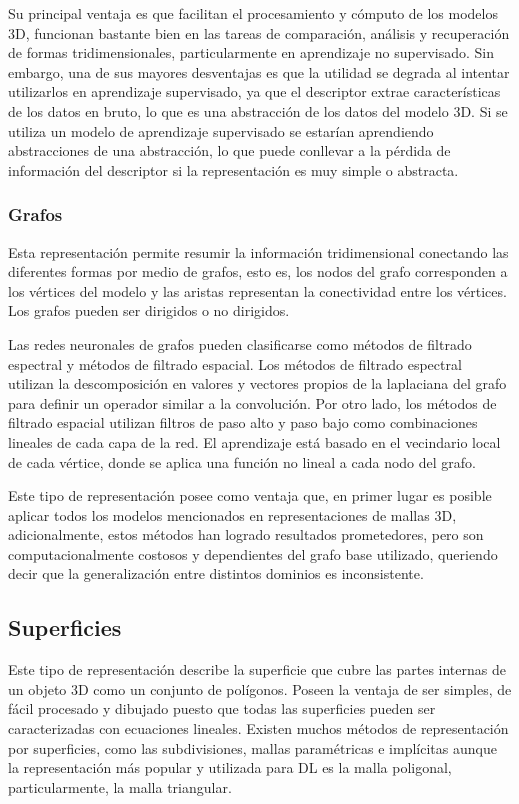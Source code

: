Su principal ventaja es que facilitan el procesamiento y cómputo de los modelos 3D, funcionan bastante bien en las tareas de comparación, análisis y recuperación de formas tridimensionales, particularmente en aprendizaje no supervisado. Sin embargo, una de sus mayores desventajas es que la utilidad se degrada al intentar utilizarlos en aprendizaje supervisado, ya que el descriptor extrae características de los datos en bruto, lo que es una abstracción de los datos del modelo 3D. Si se utiliza un modelo de aprendizaje supervisado se estarían aprendiendo abstracciones de una abstracción, lo que puede conllevar a la pérdida de información del descriptor si la representación es muy simple o abstracta.

\subsubsection{Grafos}
Esta representación permite resumir la información tridimensional conectando las diferentes formas por medio de grafos, esto es, los nodos del grafo corresponden a los vértices del modelo y las aristas representan la conectividad entre los vértices. Los grafos pueden ser dirigidos o no dirigidos.

Las redes neuronales de grafos pueden clasificarse como métodos de filtrado espectral y métodos de filtrado espacial. Los métodos de filtrado espectral utilizan la descomposición en valores y vectores propios de la laplaciana del grafo para definir un operador similar a la convolución. Por otro lado, los métodos de filtrado espacial utilizan filtros de paso alto y paso bajo como combinaciones lineales de cada capa de la red. El aprendizaje está basado en el vecindario local de cada vértice, donde se aplica una función no lineal a cada nodo del grafo.

Este tipo de representación posee como ventaja que, en primer lugar es posible aplicar todos los modelos mencionados en representaciones de mallas 3D, adicionalmente, estos métodos han logrado resultados prometedores, pero son computacionalmente costosos y dependientes del grafo base utilizado, queriendo decir que la generalización entre distintos dominios es inconsistente.

\subsection{Superficies}
Este tipo de representación describe la superficie que cubre las partes internas de un objeto 3D como un conjunto de polígonos. Poseen la ventaja de ser simples, de fácil procesado y dibujado puesto que todas las superficies pueden ser caracterizadas con ecuaciones lineales. Existen muchos métodos de representación por superficies, como las subdivisiones, mallas paramétricas e implícitas aunque la representación más popular y utilizada para DL es la malla poligonal, particularmente, la malla triangular.

